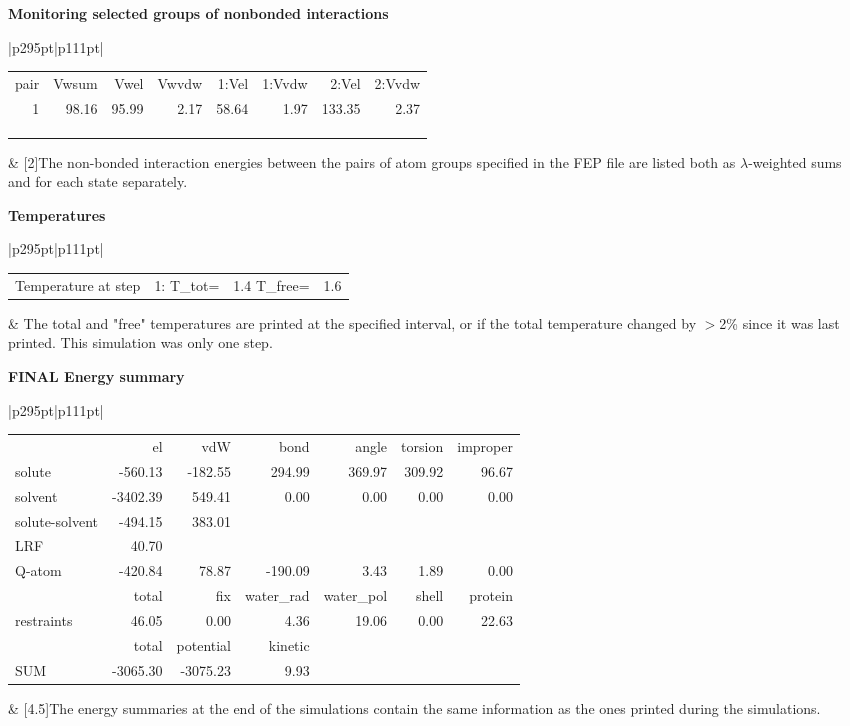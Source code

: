 \documentclass[a4paper,10pt]{article}
\begin{document}
\normalsize
\textbf{Monitoring selected groups of nonbonded interactions}
\tiny
\vspace{-1\baselineskip}
\begin{longtable}{|p{295pt}|p{111pt}|}
\hline \begin{tabular}{rrrrrrrr}pair & Vwsum & Vwel & Vwvdw & 1:Vel & 1:Vvdw & 2:Vel & 2:Vvdw \\ 1 & 98.16 & 95.99 & 2.17 & 58.64 & 1.97 & 133.35 & 2.37\\&&&&&&&\\&&&&&&&\\&&&&&&&\end{tabular} & [2\baselineskip]{The non-bonded interaction energies between the pairs of atom groups specified in the FEP file are listed both as $\lambda$-weighted sums and for each state separately.}\\
\hline
\end{longtable}
\normalsize
\textbf{Temperatures}
\tiny
\vspace{-1\baselineskip}
\begin{longtable}{|p{295pt}|p{111pt}|}
\hline \begin{tabular}{llll}Temperature at step & 1: T\_tot= & 1.4 T\_free= & 1.6\end{tabular} & The total and "free" temperatures are printed at the specified interval, or if the total temperature changed by $>$2\% since it was last printed. This simulation was only one step.\\
\hline
\end{longtable}
\normalsize
\textbf{FINAL Energy summary}
\tiny
\vspace{-1\baselineskip}
\begin{longtable}{|p{295pt}|p{111pt}|}
\hline \begin{tabular}{lrrrrrr} & el & vdW & bond & angle & torsion & improper\\solute & -560.13 & -182.55 & 294.99 & 369.97 & 309.92 & 96.67\\solvent & -3402.39 & 549.41 & 0.00 & 0.00 & 0.00 & 0.00\\solute-solvent & -494.15 & 383.01&&&&\\LRF & 40.70&&&&&\\Q-atom & -420.84 & 78.87 & -190.09 & 3.43 & 1.89 & 0.00\\ & total & fix & water\_rad & water\_pol & shell & protein\\restraints & 46.05 & 0.00 & 4.36 & 19.06 & 0.00 & 22.63 \\& total & potential & kinetic&&&\\SUM & -3065.30 & -3075.23 & 9.93&&&\end{tabular} & [4.5\baselineskip]{The energy summaries at the end of the simulations contain the same information as the ones printed during the simulations.}\\
\hline
\end{longtable}
\end{document}
